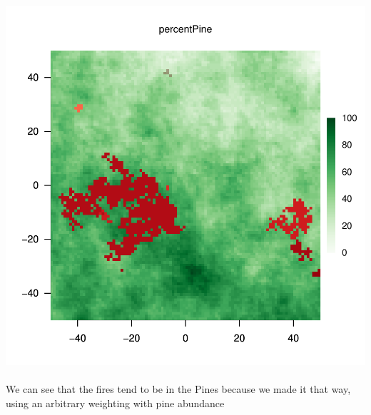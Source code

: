 \documentclass{article}
\begin{document}
\begin{Schunk}
\end{Schunk}
\includegraphics{introduction-fire-overlaid}

\paragraph{}
We can see that the fires tend to be in the Pines because we made it that way, using an arbitrary weighting with pine abundance
\end{document}
